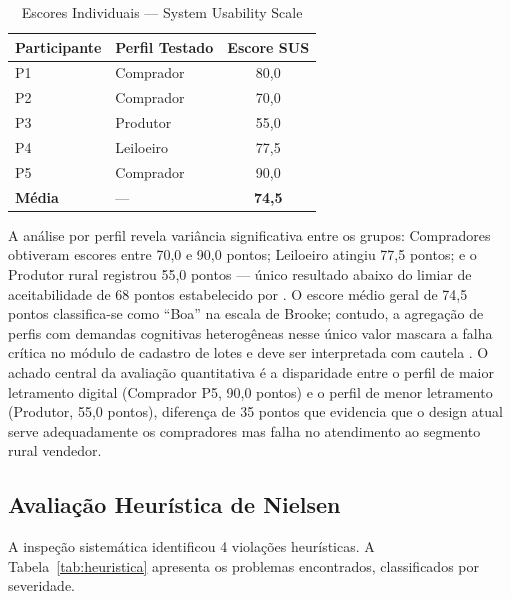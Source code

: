 \documentclass[12pt]{article}
\begin{document}
\begin{table}[h]
\centering
\caption{Escores Individuais --- System Usability Scale}
\label{tab:sus}
\begin{tabular}{llc}
\toprule
\textbf{Participante} & \textbf{Perfil Testado} & \textbf{Escore SUS} \\
\midrule
P1 & Comprador  & 80,0 \\
P2 & Comprador  & 70,0 \\
P3 & Produtor   & 55,0 \\
P4 & Leiloeiro  & 77,5 \\
P5 & Comprador  & 90,0 \\
\midrule
\textbf{Média} & --- & \textbf{74,5} \\
\bottomrule
\end{tabular}
\end{table}

A análise por perfil revela variância significativa entre os grupos: Compradores
obtiveram escores entre 70,0 e 90,0 pontos; Leiloeiro atingiu 77,5 pontos; e o Produtor
rural registrou 55,0 pontos --- único resultado abaixo do limiar de aceitabilidade de
68 pontos estabelecido por \cite{brooke1996}. O escore médio geral de 74,5 pontos
classifica-se como ``Boa'' na escala de Brooke; contudo, a agregação de perfis com
demandas cognitivas heterogêneas nesse único valor mascara a falha crítica no módulo
de cadastro de lotes e deve ser interpretada com cautela \cite{sauro2011}. O achado
central da avaliação quantitativa é a disparidade entre o perfil de maior letramento
digital (Comprador P5, 90,0 pontos) e o perfil de menor letramento (Produtor, 55,0
pontos), diferença de 35 pontos que evidencia que o design atual serve adequadamente
os compradores mas falha no atendimento ao segmento rural vendedor.

\subsection{Avaliação Heurística de Nielsen}

A inspeção sistemática identificou 4 violações heurísticas. A
Tabela~\ref{tab:heuristica} apresenta os problemas encontrados, classificados por
severidade.
\end{document}
